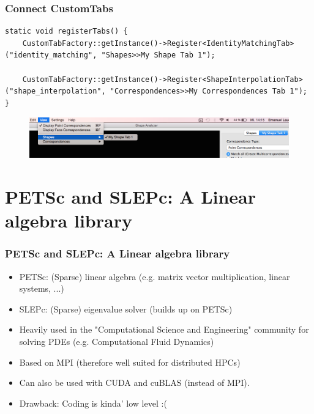 \documentclass[compress]{beamer}
\begin{document}
\begin{frame}[fragile]
\frametitle{Connect CustomTabs}
\begin{lstlisting}
static void registerTabs() {
    CustomTabFactory::getInstance()->Register<IdentityMatchingTab>("identity_matching", "Shapes>>My Shape Tab 1");

    CustomTabFactory::getInstance()->Register<ShapeInterpolationTab>("shape_interpolation", "Correspondences>>My Correspondences Tab 1");
}
\end{lstlisting}
  \begin{figure}[h]
	\centering
	\includegraphics[width=\textwidth]{tabs.png}
\end{figure}
\end{frame}

\section{PETSc and SLEPc: A Linear algebra library}
\begin{frame}
\frametitle{PETSc and SLEPc: A Linear algebra library}
\begin{itemize}
	\item PETSc: (Sparse) linear algebra (e.g. matrix vector multiplication, linear systems, ...)
	\item SLEPc: (Sparse) eigenvalue solver (builds up on PETSc)
	\item Heavily used in the "Computational Science and Engineering" community for solving PDEs (e.g. Computational Fluid Dynamics)
	\item Based on MPI (therefore well suited for distributed HPCs)
	\item Can also be used with CUDA and cuBLAS (instead of MPI).
	\item Drawback: Coding is kinda' low level :(
\end{itemize}
\end{frame}
\end{document}
